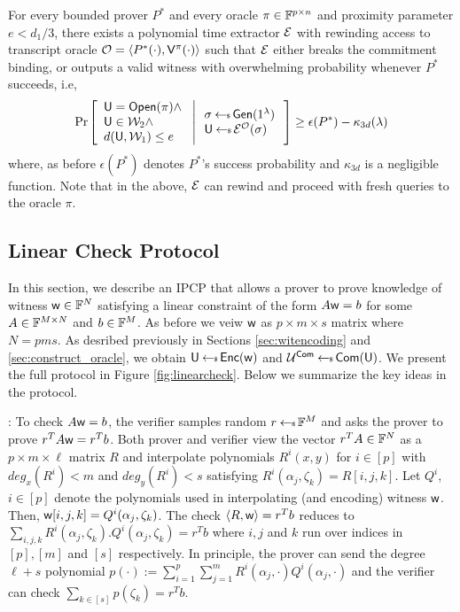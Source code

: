 \begin{lemma}[Soundness]\label{lem:proximity3d_sound}
For every bounded prover $P^\ast$ and every oracle $\pi\in \mathbb{F}^{p\times n}$ and 
proximity parameter $e<d_1/3$,
there exists a polynomial time extractor $\mathcal{E}$ with rewinding access to
transcript oracle $\mathcal{O}=\langle P^\ast(\cdot),\mathsf{V}^{\pi}(\cdot)\rangle$
such that $\mathcal{E}$ either breaks the commitment binding, or outputs a valid witness with
overwhelming probability whenever $P^\ast$ succeeds, i.e, 
{\small
\begin{align*}
\condprob{
\begin{array}{l}
\ewit=\open(\pi) \wedge \\
\ewit\in \mc{W}_2\wedge \\
d(\ewit,\mc{W}_1)\leq e
\end{array}
}{
\begin{array}{l}
\sigma\sample \gen(\secparam)\\
\ewit\sample \extr^{\mc{O}}(\sigma)
\end{array}
}\geq \epsilon(P^\ast)-\kappa_{3d}(\secpar)
\end{align*}
}
where, as before $\epsilon(P^\ast)$ denotes $P^\ast$'s success probability and $\kappa_{3d}$ is a negligible function. Note that in the above, $\mathcal{E}$ can
rewind and proceed with fresh queries to the oracle $\pi$. 	
\end{lemma}

\subsection{Linear Check Protocol}
In this section, we describe an IPCP that allows a prover to prove knowledge of
witness $\mathsf{w}\in \mathbb{F}^N$ satisfying a linear constraint of the form $A\mathsf{w} = b$
for some $A\in \mathbb{F}^{M\times N}$ and $b\in \mathbb{F}^M$. As before we veiw $\mathsf{w}$ as
$p\times m\times s$ matrix where $N=pms$. As desribed previously in Sections
\ref{sec:witencoding} and \ref{sec:construct_oracle}, we obtain $\mathsf{U}\hskip2.3pt{\gets\!\!\mbox{\tiny${\$}$\normalsize}}\, 
\mathsf{Enc}(\mathsf{w})$ and $\mathcal{U}^{\mathsf{Com}}\hskip2.3pt{\gets\!\!\mbox{\tiny${\$}$\normalsize}}\, \mathsf{Com}(\mathsf{U})$. We present the full protocol in
Figure \ref{fig:linearcheck}. Below we summarize the key ideas in the protocol.

: To check $A\mathsf{w}=b$, the verifier 
samples random $r\hskip2.3pt{\gets\!\!\mbox{\tiny${\$}$\normalsize}}\, \mathbb{F}^M$ and asks the prover to prove $r^TA\mathsf{w}=r^Tb$.
 Both prover and verifier view the
vector $r^TA\in \mathbb{F}^N$ as a $p\times m\times \ell$ matrix $R$ and interpolate
polynomials $R^i(x,y)$ for $i\in [p]$ with $deg_x(R^i)<m$ and $deg_y(R^i)<s$
satisfying $R^i(\alpha_j,\zeta_k)=R[i,j,k]$. Let $Q^i$, $i\in [p]$ denote the
polynomials used in interpolating (and encoding) witness $\mathsf{w}$. Then, 
$\mathsf{w}[i,j,k]=Q^i(\alpha_j,\zeta_k)$. The check $\langle R,\mathsf{w}\rangle=r^Tb$ reduces to
$\sum_{i,j,k}R^i(\alpha_j,\zeta_k).Q^i(\alpha_j,\zeta_k)=r^Tb$ where $i,j$ and
$k$ run over indices in $[p],[m]$ and $[s]$ respectively. In principle, the
prover can send the degree $\ell+s$ polynomial
$p(\cdot):=\sum_{i=1}^p\sum_{j=1}^mR^i(\alpha_j,\cdot)Q^i(\alpha_j,\cdot)$ and
the verifier can check $\sum_{k\in [s]} p(\zeta_k)=r^Tb$. 

